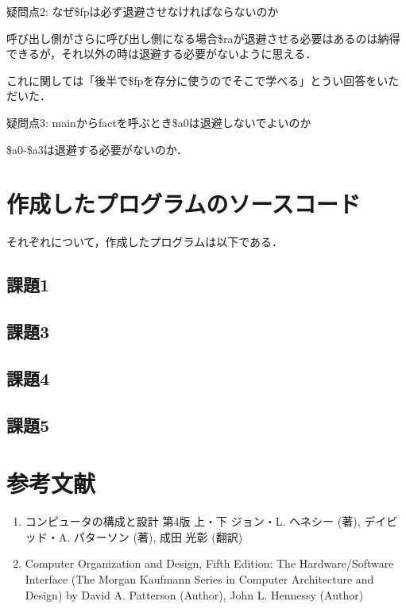 \documentclass[a4j]{jarticle}
\begin{document}
疑問点2:  なぜ\$fpは必ず退避させなければならないのか

呼び出し側がさらに呼び出し側になる場合\$raが退避させる必要はあるのは納得できるが，それ以外の時は退避する必要がないように思える．

これに関しては「後半で\$fpを存分に使うのでそこで学べる」とうい回答をいただいた．

疑問点3: mainからfactを呼ぶとき\$a0は退避しないでよいのか

\$a0-\$a3は退避する必要がないのか．


\newpage

%
%

\section{作成したプログラムのソースコード}

それぞれについて，作成したプログラムは以下である．

\subsection{課題1}





\subsection{課題3}



\subsection{課題4}



\subsection{課題5}




%
%

\section{参考文献}

\begin{enumerate}
\item コンピュータの構成と設計 第4版 上・下 ジョン・L. ヘネシー (著), デイビッド・A. パターソン (著), 成田 光彰 (翻訳)
\item Computer Organization and Design, Fifth Edition: The Hardware/Software Interface (The Morgan Kaufmann Series in Computer Architecture and Design) by David A. Patterson (Author), John L. Hennessy  (Author)
\end{enumerate}
\end{document}
